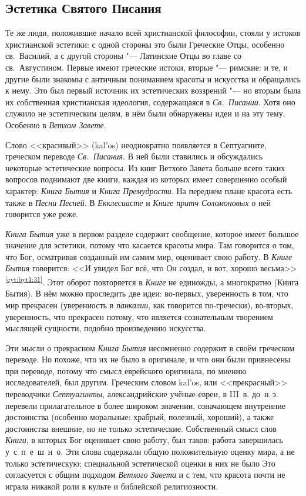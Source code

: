 \subsection{Эстетика Святого Писания}\label{sec:pismo_sw}

Те же люди, положившие начало всей христианской философии, стояли у истоков христианской эстетики: с одной стороны это были Греческие Отцы, особенно св.~Василий, а с другой стороны "--- Латинские Отцы во главе со св.~Августином. Первые имеют греческие истоки, вторые "--- римские: и те, и другие были знакомы с античным пониманием красоты и искусства и обращались к нему. Это был первый источник их эстетических воззрений "--- но вторым была их собственная христианская идеология, содержащаяся в \emph{Св.~Писании}. Хотя оно служило не эстетическим целям, в нём были обнаружены идеи и на эту тему. Особенно в \emph{Ветхом Завете}.

Слово <<красивый>> (\textgreek{kal'os}) неоднократно появляется в Септуагинте, греческом переводе \emph{Св.~Писания}. В ней были ставились и обсуждались некоторые эстетические вопросы. Из книг Ветхого Завета больше всего таких вопросов поднимают две книги, каждая из которых имеет совершенно особый характер: \emph{Книга Бытия} и \emph{Книга Премудрости}. На переднем плане красота есть также в \emph{Песни Песней}. В \emph{Екклесиасте} и \emph{Книге притч Соломоновых} о ней говорится уже реже.

 \emph{Книга Бытия} уже в первом разделе содержит сообщение, которое имеет большое значение для эстетики, потому что касается красоты мира. Там говорится о том, что Бог, осматривая созданный им самим мир, оценивает свою работу. В \emph{Книге Бытия} говорится: <<И увидел Бог всё, что Он создал, и вот, хорошо весьма>>\textsuperscript{\ref{cyt:byt1:31}}. Этот оборот повторяется в \emph{Книге} не единожды, а многократно (Книга Бытия). В нём можно проследить две идеи: во-первых, уверенность в том, что мир прекрасен (уверенность в \emph{панкалии}, как говорится по-гречески), во-вторых, уверенность, что прекрасен потому, что является сознательным творением мыслящей сущности, подобно произведению искусства.

Эти мысли о прекрасном \emph{Книга Бытия} несомненно содержит в своём греческом переводе. Но похоже, что их не было в оригинале, и что они были привнесены при переводе, потому что смысл еврейского оригинала, по мнению исследователей, был другим. Греческим словом \textgreek{kal'os}, или <<прекрасный>> переводчики \emph{Септуагинты}, александрийские учёные-евреи, в III~в. до~н.\,э. перевели прилагательное в более широком значении, означающем внутренние достоинства (особенно моральные: храбрый, полезный, хороший), а также достоинства внешние, но не только эстетические. Собственный смысл слов \emph{Книги}, в которых Бог оценивает свою работу, был таков: работа завершилась у~с~п~е~ш~н~о. Эти слова содержали общую положительную оценку мира, а не только эстетическую; специальной эстетической оценки в них не было Это согласуется с общим подходом \emph{Ветхого Завета} и с тем, что красота почти не играла никакой роли в культе и библейской религиозности.

